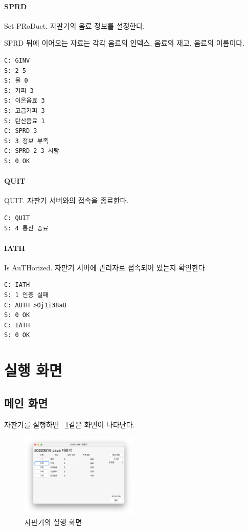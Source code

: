 \documentclass{oblivoir}
\newcommand{\figref}[1]{\figurename~\ref{#1}}
\begin{document}
    \paragraph{SPRD}
    Set PRoDuct.
    자판기의 음료 정보를 설정한다.

    SPRD 뒤에 이어오는 자료는 각각 음료의 인덱스,
    음료의 재고, 음료의 이름이다.

    \begin{verbatim}
C: GINV
S: 2 5
S: 물 0
S: 커피 3
S: 이온음료 3
S: 고급커피 3
S: 탄산음료 1
C: SPRD 3
S: 3 정보 부족
C: SPRD 2 3 사탕
S: 0 OK
    \end{verbatim}

    \paragraph{QUIT}
    QUIT. 자판기 서버와의 접속을 종료한다.

    \begin{verbatim}
C: QUIT
S: 4 통신 종료
    \end{verbatim}

    \paragraph{IATH}
    Is AuTHorized.
    자판기 서버에 관리자로 접속되어 있는지 확인한다.

    \begin{verbatim}
C: IATH
S: 1 인증 실패
C: AUTH >Oj1i38aB
S: 0 OK
C: IATH
S: 0 OK
    \end{verbatim}

    \section{실행 화면}

    \subsection{메인 화면}

    자판기를 실행하면 \figref{fig:vending-machine}\과 같은 화면이 나타난다.
    \begin{figure}[h]
        \centering
        \includegraphics[width=0.5\textwidth]{images/snapshot/vending-machine}
        \caption{자판기의 실행 화면}
        \label{fig:vending-machine}
    \end{figure}
\end{document}
